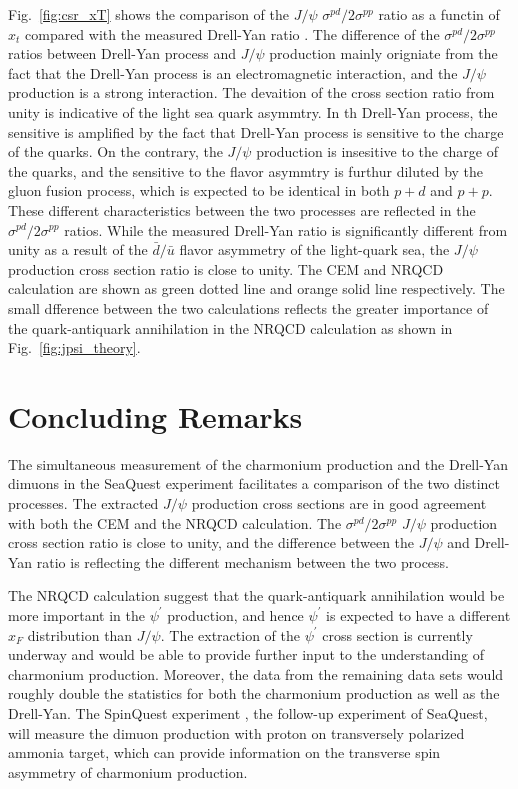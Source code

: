 \documentclass[10pt,a4paper,final]{article}
\begin{document}
Fig.~\ref{fig:csr_xT} shows the comparison of the $J/\psi$ $\sigma^{pd}/2\sigma^{pp}$ ratio
as a functin of $x_t$ compared with the measured Drell-Yan ratio \cite{dove2021}.
The difference of the $\sigma^{pd}/2\sigma^{pp}$ ratios between Drell-Yan process and $J/\psi$ 
production mainly origniate from the fact that the Drell-Yan process is an electromagnetic 
interaction, and the $J/\psi$ production is a strong interaction. The devaition of the cross
section ratio from unity is indicative of the light sea quark asymmtry. In th Drell-Yan
process, the sensitive is amplified by the fact that Drell-Yan process is sensitive to the charge of the quarks.
On the contrary, the $J/\psi$ production is insesitive to the charge of the quarks, and the sensitive to the flavor asymmtry is
furthur diluted by the gluon fusion process, which is expected to be identical in both $p+d$ and $p+p$.
These
different characteristics between the two processes are reflected in the
$\sigma^{pd}/2\sigma^{pp}$ ratios. While the measured Drell-Yan ratio
is significantly different from unity as a result of the $\bar{d}/\bar{u}$
flavor asymmetry of the light-quark sea, the $J/\psi$ production cross section ratio
is close to unity.
The CEM and NRQCD calculation are shown as green dotted line and orange solid line
respectively. The small dfference between the two calculations reflects the greater
importance of the quark-antiquark annihilation in the NRQCD calculation as shown in
Fig.~\ref{fig:jpsi_theory}.

\section{Concluding Remarks}
The simultaneous measurement of the charmonium production and the Drell-Yan dimuons
in the SeaQuest experiment facilitates a comparison of the two distinct processes. The
extracted $J/\psi$ production cross sections are in good agreement with both the CEM
and the NRQCD calculation. The $\sigma^{pd}/2\sigma^{pp}$ $J/\psi$ production cross section ratio
is close to unity, and the difference between the $J/\psi$ and Drell-Yan
ratio is reflecting the different mechanism between the two process.

The NRQCD calculation suggest that the quark-antiquark annihilation would
be more important in the $\psi^\prime$ production, and hence $\psi^\prime$ is expected
to have a different $x_F$ distribution than $J/\psi$. The extraction of the $\psi^\prime$
cross section is currently underway and would be able to provide further input to
the understanding of charmonium production. Moreover, the data from the remaining
data sets would roughly double the statistics for both the charmonium production as well as the Drell-Yan.
The SpinQuest experiment \cite{geesaman2014}, the follow-up experiment of SeaQuest, will measure the dimuon
production with proton on transversely polarized ammonia target, which can provide information
on the transverse spin asymmetry of charmonium production.

\printbibliography[heading=bibintoc,title={References}]
\end{document}
